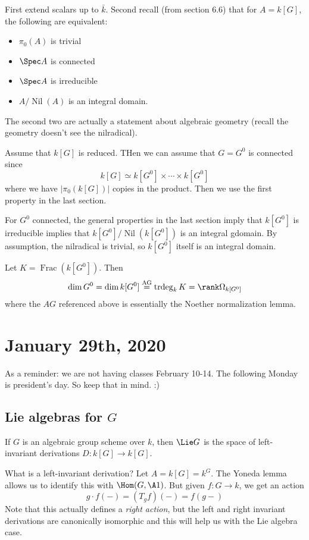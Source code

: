 \documentclass[12pt]{article}
\begin{document}
\begin{prf}
	First extend scalars up to $\bar k$. Second recall (from section 6.6) that for $A=k[G]$, the following are equivalent:
	\begin{itemize}
		\item $\pi_0(A)$ is trivial
		\item $\Spec A$ is connected
		\item $\Spec A$ is irreducible
		\item $A/\operatorname{Nil}(A)$ is an integral domain.
	\end{itemize}
	The second two are actually a statement about algebraic geometry (recall the geometry doesn't see the nilradical).

	Assume that $k[G]$ is reduced. THen we can assume that $G=G^0$ is connected since 
	\[k[G]\simeq k[G^0]\times\cdots\times k[G^0]\]
	where we have $|\pi_0(k[G])|$ copies in the product. Then we use the first property in the last section.

	For $G^0$ connected, the general properties in the last section imply that $k[G^0]$ is irreducible implies that $k[G^0]/\operatorname{Nil}(k[G^0])$ is 
	an integral gdomain. By assumption, the nilradical is trivial, so $k[G^0]$ itself is an integral domain.

	Let $K=\operatorname{Frac}(k[G^0])$. Then
	\[\dim G^0=\dim k[G^0]\stackrel{\text{AG}}{=}\operatorname{trdeg}_kK=\rank \Omega_{k[G^0]}\]
	where the $AG$ referenced above is essentially the Noether normalization lemma.
\end{prf}

\section{January 29th, 2020}
As a reminder: we are not having classes February 10-14. The following Monday is president's day. So keep that in mind. :)

\subsection{Lie algebras for \texorpdfstring{$G$}{G}}
\begin{defn}
	If $G$ is an algebraic group scheme over $k$, then $\Lie G$ is the space of left-invariant derivations $D:k[G]\to k[G]$.
\end{defn}
What is a left-invariant derivation? Let $A=k[G]=k^G$. The Yoneda lemma allows us to identify this with $\Hom(G,\A1)$.
But given $f:G\to k$, we get an action 
\[g\cdot f(-)=(T_g f)(-)=f(g-)\]
Note that this actually defines a \textit{right action}, but the left and right invariant derivations are canonically isomorphic and this 
will help us with the Lie algebra case.
\end{document}
